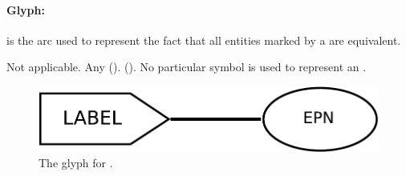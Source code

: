 \paragraph{Glyph:  }\label{sec:equivalenceArc}

 is the arc used to represent the fact that all entities
marked by a  are equivalent. 

\begin{glyphDescription}
 \glyphSboTerm Not applicable.
 \glyphOrigin Any  ().
 \glyphTarget {} ().
 \glyphEndPoint No particular symbol is used to represent an .
 \end{glyphDescription}

\begin{figure}[H]
  \centering
  \includegraphics[scale = 0.4]{images/equivalence}
  \caption{The \PD glyph for .}
  \label{fig:equivalence}
\end{figure}
